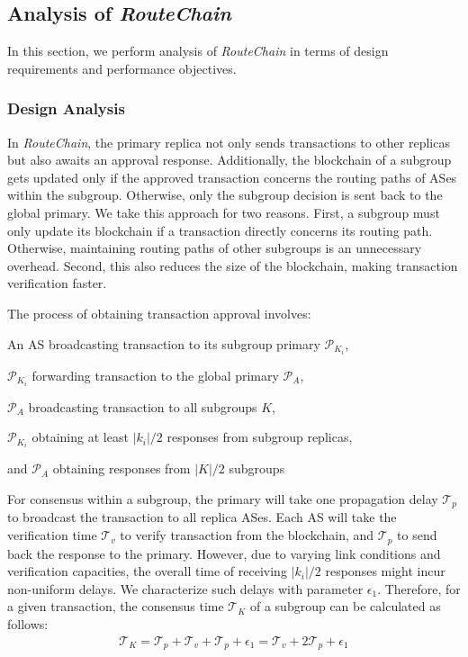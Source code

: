 \documentclass[5p]{elsarticle}
\newcommand{\rc}{{{\em RouteChain}}\xspace}
\begin{document}
\subsection{Analysis of {\em RouteChain}} \label{sec:ana}
In this section, we perform analysis of \rc in terms of design requirements and performance objectives. 
\subsubsection{Design Analysis}\label{sec:da}
In \rc, the primary replica not only sends transactions to other replicas but also awaits an approval response. Additionally, the blockchain of a subgroup gets updated only if the approved transaction concerns the routing paths of ASes within the subgroup. Otherwise, only the subgroup decision is sent back to the global primary. We take this approach for two reasons. First, a subgroup must only update its blockchain if a transaction directly concerns its routing path. Otherwise,  maintaining routing paths of other subgroups is an unnecessary overhead. Second, this also reduces the size of the blockchain, making transaction verification faster. 

The process of obtaining transaction approval involves:
\begin{enumerate*}
    \item An AS broadcasting transaction to its subgroup primary $\mathcal{P}_{K_{i}}$,
    \item $\mathcal{P}_{K_{i}}$ forwarding transaction to the global primary $\mathcal{P}_{A}$,
    \item $\mathcal{P}_{A}$ broadcasting transaction to all subgroups $K$, 
    \item $\mathcal{P}_{K_{i}}$ obtaining at least $|k_{i}|/2$ responses from subgroup replicas,
    \item and $\mathcal{P}_{A}$ obtaining responses from $|K|/2$ subgroups
\end{enumerate*}

For consensus within a subgroup, the primary will take one propagation delay $\mathcal{T}_{p}$ to broadcast the transaction to all replica ASes. Each AS will take the verification time $\mathcal{T}_{v}$ to verify transaction from the blockchain, and $\mathcal{T}_{p}$ to send back the response to the primary. However, due to varying link conditions and verification capacities, the overall time of receiving $|k_{i}|/2$ responses might incur non-uniform delays. We characterize such delays with parameter  $\epsilon_{1}$. Therefore, for a given transaction, the consensus time $\mathcal{T}_{K}$ of a subgroup can be calculated as follows: 
\begin{align} \label{eq:1}
    \mathcal{T}_{K} = \mathcal{T}_{p} +  \mathcal{T}_{v} + \mathcal{T}_{p} + \epsilon_{1} = \mathcal{T}_{v} + 2\mathcal{T}_{p} + \epsilon_{1}
\end{align}
\end{document}
